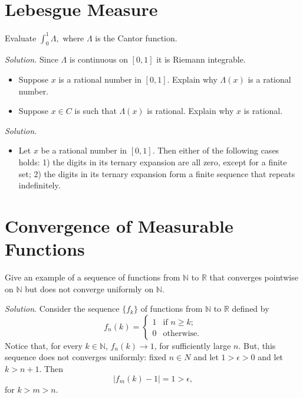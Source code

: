 \documentclass[14.5pt]{article}
\newcommand{\N}{\mathbb{N}}
\newcommand{\R}{\mathbb{R}}
\newenvironment{problem}[2][Problem]{\begin{mdframed}[backgroundcolor=gray!10, leftline = false, rightline=false, linewidth=0.25pt]  \begin{trivlist}
\item[\hskip \labelsep {\bfseries #1}\hskip \labelsep {\bfseries #2.}]}{\end{trivlist} \end{mdframed}  }
\begin{document}
\section*{Lebesgue Measure}
\begin{problem}{2D.19}
Evaluate $\int_0^1 \Lambda,$ where $\Lambda$ is the Cantor function.
\end{problem}
\textit{Solution.} Since $\Lambda$ is continuous on $[0,1]$ it is Riemann integrable.

\begin{problem}{2D.22}
\text{ }
\begin{itemize}
    \item[(a)] Suppose $x$ is a rational number in $[0,1]$. Explain why $\Lambda(x)$ is a rational number.
    \item[(b)] Suppose $x \in C$ is such that $\Lambda(x)$ is rational. Explain why $x$ is rational.
\end{itemize}
\end{problem}
\textit{Solution.} \begin{itemize}
    \item[(a)] Let $x$ be a rational number in $[0,1]$. Then either of the following cases holds: 1) the digits in its ternary expansion are all zero, except for a finite set; 2) the digits in its ternary expansion form a finite sequence that repeats indefinitely.
\end{itemize}


\section*{Convergence of Measurable Functions}

\begin{problem}{2E.2} Give an example of a sequence of functions from $\N$ to $\R$ that converges pointwise on $\N$ but does not converge uniformly on $\N$.
\end{problem}
\textit{Solution}. Consider the sequence $\{f_k\}$ of functions from $\N$ to $\R$ defined by
\begin{equation*}
    f_n(k) = \begin{cases}
        1 & \text{if } n \ge k; \\
        0 & \text{otherwise.}
    \end{cases}
\end{equation*} 
Notice that, for every $k \in \N$, $f_n(k) \to 1$, for sufficiently large $n$. But, this sequence does not converges uniformly: fixed $n\in N$ and let $ 1 > \epsilon > 0$ and let $k > n + 1$. Then
$$|f_m(k) - 1 | = 1 > \epsilon,$$
for $k > m > n.$
\end{document}
